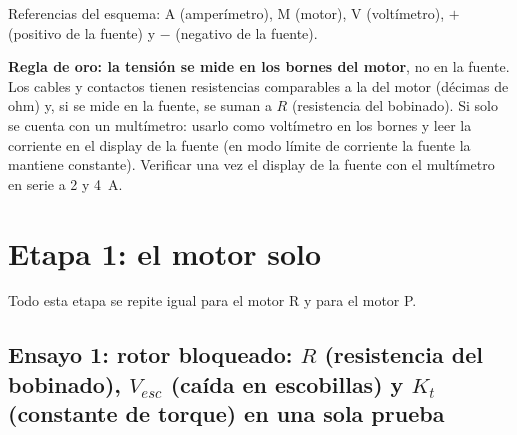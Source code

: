 \documentclass[11pt,a4paper]{article}
\begin{document}
\begin{center}
\end{center}
Referencias del esquema: A (amperímetro), M (motor), V (voltímetro), $+$ (positivo de la fuente) y $-$ (negativo de la fuente).

\textbf{Regla de oro: la tensión se mide en los bornes del motor}, no en la fuente. Los cables y contactos tienen resistencias comparables a la del motor (décimas de ohm) y, si se mide en la fuente, se suman a $R$ (resistencia del bobinado). Si solo se cuenta con un multímetro: usarlo como voltímetro en los bornes y leer la corriente en el display de la fuente (en modo límite de corriente la fuente la mantiene constante). Verificar una vez el display de la fuente con el multímetro en serie a 2 y 4~A.

\section{Etapa 1: el motor solo}
\label{sec:etapa1}

Todo esta etapa se repite igual para el motor R y para el motor P.

\subsection{Ensayo 1: rotor bloqueado: $R$ (resistencia del bobinado), $V_{esc}$ (caída en escobillas) y $K_t$ (constante de torque) en una sola prueba}
\label{ens:bloqueado}
\end{document}
